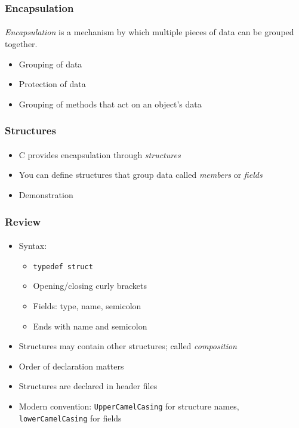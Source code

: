 \documentclass[]{beamer}
\begin{document}
\begin{frame}[fragile]
  \frametitle{Encapsulation}
  \framesubtitle{}

\begin{definition}
\emph{Encapsulation} is a mechanism by which multiple 
pieces of data can be grouped together.  
\end{definition}


\begin{itemize}%
  \item<3-> Grouping of data
  \item<4-> Protection of data
  \item<5-> Grouping of methods that act on an object's data
\end{itemize}


\end{frame}

\begin{frame}[fragile]
  \frametitle{Structures}
  \framesubtitle{}

\begin{itemize}[<+->]
  \item C provides encapsulation through \emph{structures}
  \item You can define structures that group data called \emph{members}
  or \emph{fields}
  \item Demonstration
\end{itemize}

\end{frame}

\begin{frame}[fragile]
  \frametitle{Review}
  \framesubtitle{}

\begin{itemize}[<+->]
  \item Syntax: 
  \begin{itemize}
    \item \texttt{typedef struct}
    \item Opening/closing curly brackets
    \item Fields: type, name, semicolon
    \item Ends with name and semicolon
  \end{itemize}
  \item Structures may contain other structures; called \emph{composition}
  \item Order of declaration matters
  \item Structures are declared in header files
  \item Modern convention: \texttt{UpperCamelCasing} 
  for structure names, \texttt{lowerCamelCasing} for fields
\end{itemize}

\end{frame}
\end{document}
